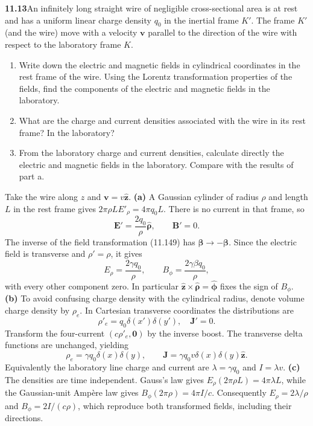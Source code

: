 \par\bigskip
\noindent\textbf{11.13}\quad An infinitely long straight wire of negligible cross-sectional area is at rest and has a uniform linear charge density $q_{0}$ in the inertial frame $K'$. The frame $K'$ (and the wire) move with a velocity $\mathbf{v}$ parallel to the direction of the wire with respect to the laboratory frame $K$.
\begin{enumerate}
\item[(a)] Write down the electric and magnetic fields in cylindrical coordinates in the rest frame of the wire. Using the Lorentz transformation properties of the fields, find the components of the electric and magnetic fields in the laboratory.
\item[(b)] What are the charge and current densities associated with the wire in its rest frame? In the laboratory?
\item[(c)] From the laboratory charge and current densities, calculate directly the electric and magnetic fields in the laboratory. Compare with the results of part a.
\end{enumerate}
\solution
Take the wire along $z$ and $\mathbf v=v\hat{\mathbf z}$.
\textbf{(a)} A Gaussian cylinder of radius $\rho$ and length $L$
in the rest frame gives $2\pi\rho L E'_\rho=4\pi q_0L$.
There is no current in that frame, so
\[
\mathbf E'=\frac{2q_0}{\rho}\hat{\boldsymbol\rho},\qquad
\mathbf B'=0.
\]
The inverse of the field transformation (11.149) has
$\boldsymbol\beta\to-\boldsymbol\beta$. Since the electric field
is transverse and $\rho' =\rho$, it gives
\[
\boxed{E_\rho=\frac{2\gamma q_0}{\rho},\qquad
B_\phi=\frac{2\gamma\beta q_0}{\rho},}
\]
with every other component zero. In particular
$\hat{\mathbf z}\times\hat{\boldsymbol\rho}=\hat{\boldsymbol\phi}$
fixes the sign of $B_\phi$.
\textbf{(b)} To avoid confusing charge density with the cylindrical
radius, denote volume charge density by $\rho_e$. In Cartesian
transverse coordinates the distributions are
\[
\rho'_e=q_0\delta(x')\delta(y'),\quad \mathbf J'=0.
\]
Transform the four-current $(c\rho'_e,\mathbf0)$ by the inverse
boost. The transverse delta functions are unchanged, yielding
\[
\boxed{\rho_e=\gamma q_0\delta(x)\delta(y),\qquad
\mathbf J=\gamma q_0v\delta(x)\delta(y)\hat{\mathbf z}.}
\]
Equivalently the laboratory line charge and current are
$\lambda=\gamma q_0$ and $I=\lambda v$.
\textbf{(c)} The densities are time independent. Gauss's law gives
$E_\rho(2\pi\rho L)=4\pi\lambda L$, while the Gaussian-unit
Amp\`ere law gives $B_\phi(2\pi\rho)=4\pi I/c$. Consequently
$E_\rho=2\lambda/\rho$ and $B_\phi=2I/(c\rho)$, which reproduce
both transformed fields, including their directions.

